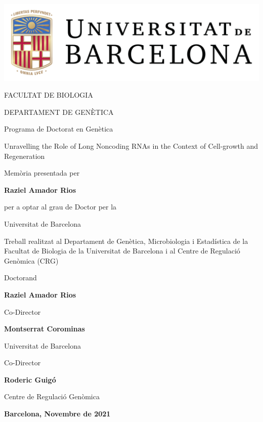 \begin{titlepage}

\begin{center}
\includegraphics[height=0.07\textheight]{img/cover/ub.png}
  
\vspace*{1ex}
FACULTAT DE BIOLOGIA

DEPARTAMENT DE GENÈTICA

Programa de Doctorat en Genètica

\vspace*{2ex}

{\huge\mdseries Unravelling the Role of Long Noncoding RNAs in the Context of Cell-growth and Regeneration\par}
\vspace*{2ex}

Memòria presentada per    

\textbf{Raziel Amador Rios}

per a optar al grau de Doctor per la

Universitat de Barcelona

\vspace*{3ex}
Treball realitzat al Departament de Genètica, Microbiologia i Estadística de la Facultat de Biologia de la Universitat de Barcelona i al Centre de Regulació Genòmica (CRG)

\vfill
\begin{minipage}[b]{1\linewidth}\centering
Doctorand
  
\textbf{Raziel Amador Rios}
\end{minipage}
\end{center}

\vspace*{5ex}
\begin{minipage}[b]{0.45\linewidth}\centering
Co-Director
  
\textbf{Montserrat Corominas}

Universitat de Barcelona
\end{minipage}
\hfill
\begin{minipage}[b]{0.45\linewidth}\centering

Co-Director

\textbf{Roderic Guigó}

Centre de Regulació Genòmica
\end{minipage}
\vspace*{2ex}

\begin{center}
\textbf{Barcelona, Novembre de 2021}
\end{center}

\end{titlepage}

